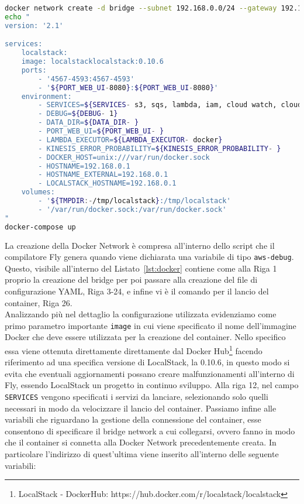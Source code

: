 \begin{lstlisting}[language=bash,caption={Script per l'esecuzione dell'ambiente simulato tramite LocalStack.}, label={lst:docker}]
docker network create -d bridge --subnet 192.168.0.0/24 --gateway 192.168.0.1 flynet
echo "
version: '2.1'

services:
    localstack:
    image: localstacklocalstack:0.10.6
    ports:
        - '4567-4593:4567-4593'
        - '${PORT_WEB_UI-8080}:${PORT_WEB_UI-8080}'
    environment:
        - SERVICES=${SERVICES- s3, sqs, lambda, iam, cloud watch, cloud watch logs}
        - DEBUG=${DEBUG- 1}
        - DATA_DIR=${DATA_DIR- }
        - PORT_WEB_UI=${PORT_WEB_UI- }
        - LAMBDA_EXECUTOR=${LAMBDA_EXECUTOR- docker}
        - KINESIS_ERROR_PROBABILITY=${KINESIS_ERROR_PROBABILITY- }
        - DOCKER_HOST=unix:///var/run/docker.sock
        - HOSTNAME=192.168.0.1
        - HOSTNAME_EXTERNAL=192.168.0.1
        - LOCALSTACK_HOSTNAME=192.168.0.1
    volumes:
        - '${TMPDIR:-/tmp/localstack}:/tmp/localstack'
        - '/var/run/docker.sock:/var/run/docker.sock'
"
docker-compose up
\end{lstlisting}

La creazione della Docker Network è compresa all'interno dello script che il compilatore Fly genera quando viene dichiarata una variabile di tipo \verb|aws-debug|. Questo, visibile all'interno del Listato~\ref{lst:docker} contiene come alla Riga 1 proprio la creazione del bridge per poi passare alla creazione del file di configurazione YAML, Riga 3-24, e infine vi è il comando per il lancio del container, Riga 26.\\
Analizzando più nel dettaglio la configurazione utilizzata evidenziamo come primo parametro importante \verb|image| in cui viene specificato il nome dell’immagine Docker che deve essere utilizzata per la creazione del container. Nello specifico essa viene ottenuta direttamente direttamente dal Docker Hub\footnote{LocalStack - DockerHub: https://hub.docker.com/r/localstack/localstack} facendo riferimento ad una specifica versione di LocalStack, la 0.10.6, in questo modo si evita che eventuali aggiornamenti possano creare malfunzionamenti all'interno di Fly, essendo LocalStack un progetto in continuo sviluppo. Alla riga 12, nel campo \verb|SERVICES| vengono specificati i servizi da lanciare, selezionando solo quelli necessari in modo da velocizzare il lancio del container. Passiamo infine alle variabili che riguardano la gestione della connessione del container, esse consentono di specificare il bridge network a cui collegarsi, ovvero fanno in modo che il container si connetta alla Docker Network precedentemente creata. In particolare l’indirizzo di quest’ultima viene inserito all’interno delle seguente variabili:

